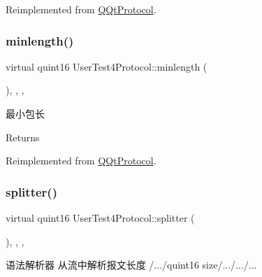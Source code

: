 Reimplemented from \mbox{\hyperlink{class_q_qt_protocol_af41bc3116abbbcfc9af45e151a253ff7}{Q\+Qt\+Protocol}}.

\mbox{\label{class_user_test4_protocol_af34d5bf64c211abe33f8c47af07832bd}} 
\subsubsection{\texorpdfstring{minlength()}{minlength()}}
{\footnotesize\ttfamily virtual quint16 User\+Test4\+Protocol\+::minlength (\begin{DoxyParamCaption}{ }\end{DoxyParamCaption})\hspace{0.3cm}{\ttfamily [inline]}, {\ttfamily [override]}, {\ttfamily [protected]}, {\ttfamily [virtual]}}



最小包长 

\begin{DoxyReturn}{Returns}

\end{DoxyReturn}


Reimplemented from \mbox{\hyperlink{class_q_qt_protocol_a2b00f53d3dd0eed817eeecff422891f3}{Q\+Qt\+Protocol}}.

\mbox{\label{class_user_test4_protocol_a3e909f7178da7a2a8f520f9a5e9d381d}} 
\subsubsection{\texorpdfstring{splitter()}{splitter()}}
{\footnotesize\ttfamily virtual quint16 User\+Test4\+Protocol\+::splitter (\begin{DoxyParamCaption}\item[{const Q\+Byte\+Array \&}]{ }\end{DoxyParamCaption})\hspace{0.3cm}{\ttfamily [inline]}, {\ttfamily [override]}, {\ttfamily [protected]}, {\ttfamily [virtual]}}



语法解析器 从流中解析报文长度 /.../quint16 size/.../.../... 



